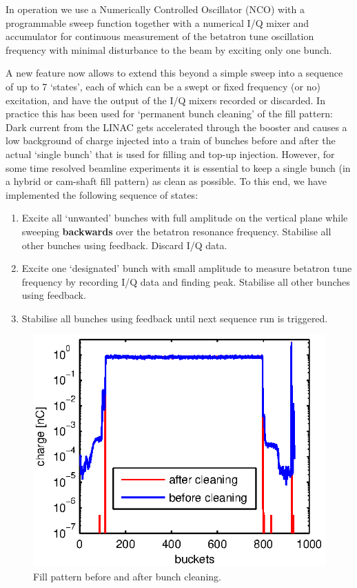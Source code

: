 \documentclass[a4paper]{jacow}
\begin{document}
 In operation we use a Numerically Controlled Oscillator (NCO) with a
programmable sweep function together with a numerical I/Q mixer and accumulator
for continuous measurement of the betatron tune oscillation frequency
\cite{status} with minimal disturbance to the beam by exciting only one bunch.

A new feature now allows to extend this beyond a simple sweep into a sequence of up to 7 `states', each of which can be a swept or fixed frequency (or no) excitation, and have the output of the I/Q mixers recorded or discarded.
In practice this has been used for `permanent bunch cleaning' of the fill pattern: Dark current from the LINAC gets accelerated through the booster and causes a low background of charge injected into a train of bunches before and after the actual `single bunch' that is used for filling and top-up injection. However, for some time resolved beamline experiments it is essential to keep a single bunch (in a hybrid or cam-shaft fill pattern) as clean as possible. To this end, we have implemented the following sequence of states:
\begin{enumerate}
\item Excite all `unwanted' bunches with full amplitude on the vertical plane while sweeping \textbf{backwards} over the betatron resonance frequency. Stabilise all other bunches using feedback. Discard I/Q data.
\item Excite one `designated' bunch with small amplitude to measure betatron tune frequency by recording I/Q data and finding peak. Stabilise all other bunches using feedback.
\item Stabilise all bunches using feedback until next sequence run is triggered.
\end{enumerate}

\begin{figure}%
\includegraphics[width=\linewidth]{WEPD24_f1.eps}
\caption{Fill pattern before and after bunch cleaning.}
\label{cleaning}
\end{figure}
\end{document}
